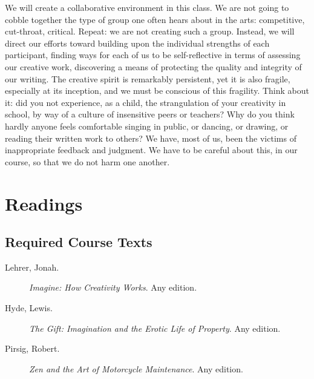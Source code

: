 \documentclass[letterpaper,10pt,headsepline]{scrreprt}
\begin{document}
We will create a collaborative environment in this class. We are not going to cobble together the type of group one often hears about in the arts: competitive, cut-throat, critical. Repeat: we are not creating such a group. Instead, we will direct our efforts toward building upon the individual strengths of each participant, finding ways for each of us to be self-reflective in terms of assessing our creative work, discovering a means of protecting the quality and integrity of our writing. The creative spirit is remarkably persistent, yet it is also fragile, especially at its inception, and
we must be conscious of this fragility. Think about it: did you not experience, as a child, the strangulation of your creativity in school, by way of a culture of insensitive peers or teachers? Why do you think hardly anyone feels comfortable singing in public, or dancing, or drawing, or reading their written work to others? We have, most of us, been the victims of inappropriate feedback and judgment. We have to be careful about this, in our course, so that we do not harm one another.

\section{Readings}
\subsection{Required Course Texts}

\begin{description}
\item [Lehrer, Jonah.] \textit{Imagine: How Creativity Works}. Any edition.
\item [Hyde, Lewis.] \textit{The Gift: Imagination and the Erotic Life of Property}. Any edition.
\item [Pirsig, Robert.] \textit{Zen and the Art of Motorcycle Maintenance}. Any edition.
\end{description}
\end{document}
